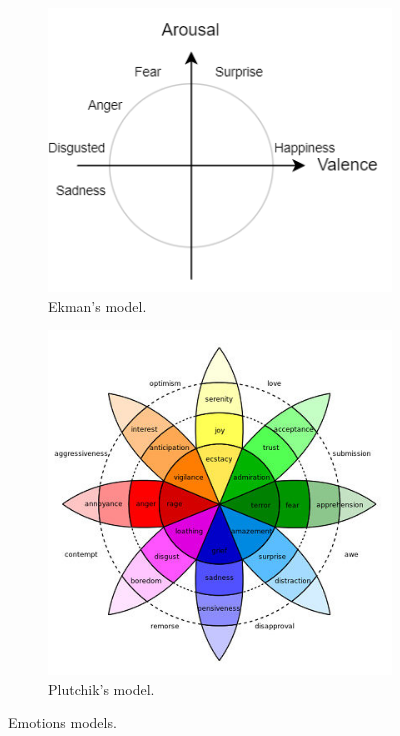   \begin{figure}[h]
    \begin{subfigure}{.5\textwidth}
    \centering
      \includegraphics[width=1\linewidth]{figs/ekmans_model.png}
      \caption{Ekman's model.}
    \end{subfigure}%
    \begin{subfigure}{.5\textwidth}
    \centering
      \includegraphics[width=1\linewidth]{figs/plutchiks_model.jpg}
      \caption{Plutchik's model.}
    \end{subfigure}
    \caption{Emotions models.}
    \label{fig:c2:emotions_models}
  \end{figure}